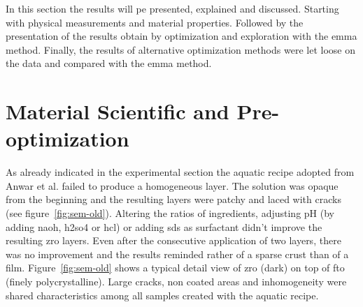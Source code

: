 In this section the results will pe presented, explained and discussed. 
Starting with physical measurements and material properties. 
Followed by the presentation of the results obtain by optimization and exploration with the \gls{emma} method. 
Finally, the results of alternative optimization methods were let loose on the data and compared with the \gls{emma} method. 

\section{Material Scientific and Pre-optimization}
\label{sec:res-mat}
As already indicated in the experimental section the aquatic recipe adopted from Anwar et al.\cite{Anwar2017} failed to produce a homogeneous layer. 
The solution was opaque from the beginning and the resulting layers were patchy and laced with cracks (see figure~\ref{fig:sem-old}). 
Altering the ratios of ingredients, adjusting pH (by adding \gls{naoh}, \gls{h2so4} or \gls{hcl}) or adding \gls{sds} as surfactant didn't improve the resulting \gls{zro} layers. 
Even after the consecutive application of two layers, there was no improvement and the results reminded rather of a sparse crust than of a film. 
%
Figure~\ref{fig:sem-old} shows a typical detail view of \gls{zro} (dark) on top of \gls{fto} (finely polycrystalline). 
Large cracks, non coated areas and inhomogeneity were 
shared characteristics among 
all samples created with the aquatic recipe. 

